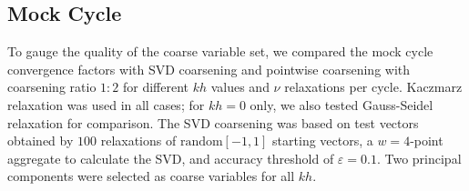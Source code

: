 \documentclass{article}
\begin{document}
\subsection{Mock Cycle}
\label{mock_cycle}
To gauge the quality of the coarse variable set, we compared the mock cycle convergence factors with SVD coarsening and pointwise coarsening with coarsening ratio $1:2$ for different $kh$ values and $\nu$ relaxations per cycle. Kaczmarz relaxation was used in all cases; for $kh=0$ only, we also tested Gauss-Seidel relaxation for comparison. The SVD coarsening was based on test vectors obtained by $100$ relaxations of $\text{random}[-1,1]$ starting vectors, a $w=4$-point aggregate to calculate the SVD, and accuracy threshold of  $\varepsilon=0.1$. Two principal components were selected as coarse variables for all $kh$.
 
\end{document}
